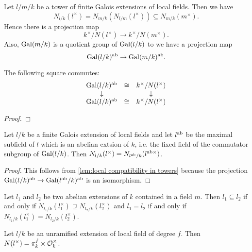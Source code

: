 Let $l / m / k$ be a tower of finite Galois extensions of local fields.
Then we have
\[
	N_{l/k} (l^\times) = N_{m/k}(N_{l/m}(l^\times)) \subseteq N_{m/k}(m^\times).
\]
Hence there is a projection map
\[
	k^\times / N(l^\times) \to k^\times / N(m^\times).
\]
Also, $\mathrm{Gal}(m/k)$ is a quotient group of $\mathrm{Gal}(l/k)$ to we have a projection map
\[
	\mathrm{Gal}(l/k)^{\mathrm{ab}} \to \mathrm{Gal}(m/k)^{\mathrm{ab}}.
\]

\begin{lemma} \label{lem:local compatibility in towers}
	The following square commutes:
	\[
		\begin{matrix}
			\mathrm{Gal}(l/k)^{\mathrm{ab}} & \cong & k^\times / N(l^\times) \\
			\downarrow && \downarrow \\
			\mathrm{Gal}(l/k)^{\mathrm{ab}} & \cong & k^\times / N(l^\times)
		\end{matrix}
	\]
\end{lemma}

\begin{proof}
\end{proof}


\begin{theorem} \label{thm:local norm limitation}
	Let $l/k$ be a finite Galois extension of local fields and let $l^{\mathrm{ab}}$ be the
	maximal subfield of $l$ which is an abelian extsion of $k$, i.e. the fixed field of
	the commutator subgroup of $\mathrm{Gal}(l/k)$.
	Then $N_{l/k}(l^\times) = N_{l^{\mathrm{ab}}/k}(l^{\mathrm{ab}\times})$.
\end{theorem}

\begin{proof}
	This follows from \ref{lem:local compatibility in towers} because the projection
	$\mathrm{Gal}(l/k)^{\mathrm{ab}} \to \mathrm{Gal}(l^{\mathrm{ab}}/k)^{\mathrm{ab}}$ is an isomorphism.
\end{proof}



\begin{theorem} \label{lem:local abelian classification}
	Let $l_1$ and $l_2$ be two abelian extensions of $k$ contained in a field $m$.
	Then $l_1 \subseteq l_2$ if and only if $N_{l_1/k}(l_1^\times) \supseteq N_{l_2/k}(l_2^\times)$
	and $l_1 = l_2$ if and only if $N_{l_1/k}(l_1^\times) = N_{l_2/k}(l_2^\times)$.
\end{theorem}


\begin{example}
	Let $l/k$ be an unramified extension of local field of degree $f$.
	Then $N(l^\times) = \pi_k^f \times {\mathcal O}_k^\times$.
\end{example}

